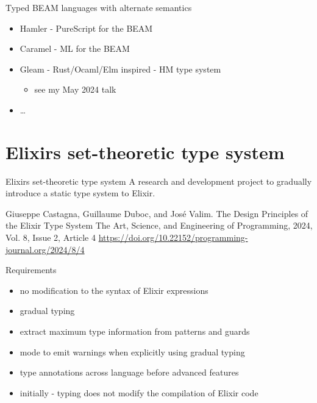 \documentclass[
  ignorenonframetext,
  aspectratio=169]{beamer}
\providecommand{\tightlist}{%
  \setlength{\itemsep}{0pt}\setlength{\parskip}{0pt}}
\begin{document}
\begin{frame}{Typed BEAM languages with alternate semantics}
\label{typed-beam-languages-with-alternate-semantics}
\begin{itemize}
\tightlist
\item
  Hamler - PureScript for the BEAM
\item
  Caramel - ML for the BEAM
\item
  Gleam - Rust/Ocaml/Elm inspired - HM type system

  \begin{itemize}
  \tightlist
  \item
    see my May 2024 talk
  \end{itemize}
\item
  \ldots{}
\end{itemize}
\end{frame}

\section{Elixir\textquotesingle s set-theoretic type
system}\label{elixirs-set-theoretic-type-system-7}

\begin{frame}{Elixir\textquotesingle s set-theoretic type system}
\label{elixirs-set-theoretic-type-system-8}
A research and development project to gradually introduce a static type
system to Elixir.

\small Giuseppe Castagna, Guillaume Duboc, and José Valim. The Design
Principles of the Elixir Type System The Art, Science, and Engineering
of Programming, 2024, Vol. 8, Issue 2, Article 4
\url{https://doi.org/10.22152/programming-journal.org/2024/8/4}
\end{frame}

\begin{frame}{Requirements}
\label{requirements}
\begin{itemize}
\tightlist
\item
  no modification to the syntax of Elixir expressions
\item
  gradual typing
\item
  extract maximum type information from patterns and guards
\item
  mode to emit warnings when explicitly using gradual typing
\item
  type annotations across language before advanced features
\item
  initially - typing does not modify the compilation of Elixir code
\end{itemize}
\end{frame}
\end{document}
